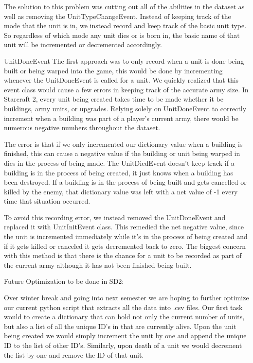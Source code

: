 \documentclass[a4paper,12pt]{report}
\begin{document}
The solution to this problem was cutting out all of the abilities in the dataset as well as removing the UnitTypeChangeEvent. Instead of keeping track of the mode that the unit is in, we instead record and keep track of the basic unit type. So regardless of which mode any unit dies or is born in, the basic name of that unit will be incremented or decremented accordingly. 

UnitDoneEvent
The first approach was to only record when a unit is done being built or being warped into the game, this would be done by incrementing whenever the UnitDoneEvent is called for a unit. We quickly realized that this event class would cause a few errors in keeping track of the accurate army size. In Starcraft 2, every unit being created takes time to be made whether it be buildings, army units, or upgrades. Relying solely on UnitDoneEvent to correctly increment when a building was part of a player’s current army, there would be numerous negative numbers throughout the dataset.

The error is that if we only incremented our dictionary value when a building is finished, this can cause a negative value if the building or unit being warped in dies in the process of being made. The UnitDiedEvent doesn’t keep track if a building is in the process of being created, it just knows when a building has been destroyed. If a building is in the process of being built and gets cancelled or killed by the enemy, that dictionary value was left with a net value of -1 every time that situation occurred. 

To avoid this recording error, we instead removed the UnitDoneEvent and replaced it with UnitInitEvent class. This remedied the net negative value, since the unit is incremented immediately while it’s in the process of being created and if it gets killed or canceled it gets decremented back to zero. The biggest concern with this method is that there is the chance for a unit to be recorded as part of the current army although it has not been finished being built. 


Future Optimization to be done in SD2:

Over winter break and going into next semester we are hoping to further optimize our current python script that extracts all the data into .csv files. Our first task would to create a dictionary that can hold not only the current number of units, but also a list of all the unique ID’s in that are currently alive. Upon the unit being created we would simply increment the unit by one and append the unique ID to the list of other ID’s. Similarly, upon death of a unit we would decrement the list by one and remove the ID of that unit.
\end{document}
